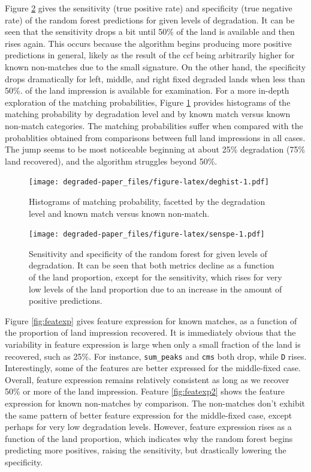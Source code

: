 \documentclass[12pt,]{article}
\theoremstyle{definition}
\theoremstyle{definition}
\theoremstyle{definition}
\theoremstyle{remark}
\begin{document}
Figure \ref{fig:senspe} gives the sensitivity (true positive rate) and
specificity (true negative rate) of the random forest predictions for
given levels of degradation. It can be seen that the sensitivity drops a
bit until 50\% of the land is available and then rises again. This
occurs because the algorithm begins producing more positive predictions
in general, likely as the result of the ccf being arbitrarily higher for
known non-matches due to the small signature. On the other hand, the
specificity drops dramatically for left, middle, and right fixed
degraded lands when less than 50\%. of the land impression is available
for examination. For a more in-depth exploration of the matching
probabilities, Figure \ref{fig:deghist} provides histograms of the
matching probability by degradation level and by known match versus
known non-match categories. The matching probabilities suffer when
compared with the probablities obtained from comparisons between full
land impressions in all cases. The jump seems to be most noticeable
beginning at about 25\% degradation (75\% land recovered), and the
algorithm struggles beyond 50\%.

\begin{figure}[htbp]
\centering
\texttt{[image: degraded-paper\_files/figure-latex/deghist-1.pdf]}
\caption{\label{fig:deghist}Histograms of matching probability, facetted by
the degradation level and known match versus known non-match.}
\end{figure}

\begin{figure}[htbp]
\centering
\texttt{[image: degraded-paper\_files/figure-latex/senspe-1.pdf]}
\caption{\label{fig:senspe}Sensitivity and specificity of the random forest
for given levels of degradation. It can be seen that both metrics
decline as a function of the land proportion, except for the
sensitivity, which rises for very low levels of the land proportion due
to an increase in the amount of positive predictions.}
\end{figure}

Figure \ref{fig:featexp} gives feature expression for known matches, as
a function of the proportion of land impression recovered. It is
immediately obvious that the variability in feature expression is large
when only a small fraction of the land is recovered, such as 25\%. For
instance, \texttt{sum\_peaks} and \texttt{cms} both drop, while
\texttt{D} rises. Interestingly, some of the features are better
expressed for the middle-fixed case. Overall, feature expression remains
relatively consistent as long as we recover 50\% or more of the land
impression. Feature \ref{fig:featexp2} shows the feature expression for
known non-matches by comparison. The non-matches don't exhibit the same
pattern of better feature expression for the middle-fixed case, except
perhaps for very low degradation levels. However, feature expression
rises as a function of the land proportion, which indicates why the
random forest begins predicting more positives, raising the sensitivity,
but drastically lowering the specificity.
\end{document}
